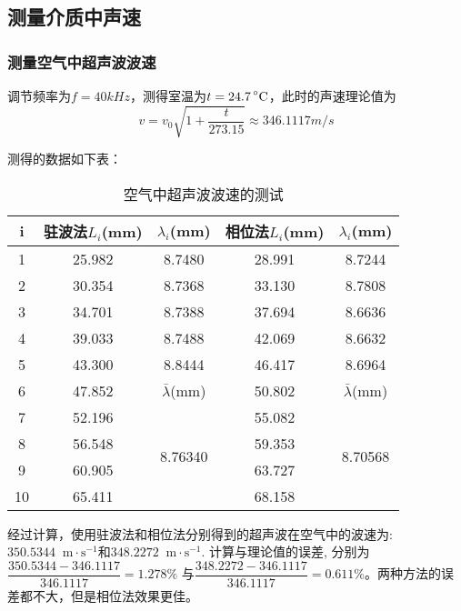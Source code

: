 \documentclass[11pt]{article}
\newcommand*{\unit}[1]{\mathop{}\!\mathrm{#1}}
\newcommand*{\mcelsius}{\unit{\prescript{\circ}{}C}}
\begin{document}
\subsection{测量介质中声速}

\subsubsection{测量空气中超声波波速}

调节频率为$f=40kHz$，测得室温为$t=24.7 \mcelsius$，此时的声速理论值为\begin{displaymath}v=v_0\sqrt{1+\frac{t}{273.15}}\approx 346.1117 m/s\end{displaymath}

测得的数据如下表：

\begin{table}[H]
    \centering
    \caption{空气中超声波波速的测试}
    \begin{tabular}{|c|c|c|c|c|}
        \hline
        i&驻波法$L_i$(mm)&$\lambda_i$(mm)&相位法$L_i$(mm)&$\lambda_i$(mm)\\
        \hline
        1&25.982  & 8.7480  & 28.991  & 8.7244 \\
        \hline
        2&30.354  & 8.7368  & 33.130  & 8.7808 \\
        \hline
        3&34.701  & 8.7388  & 37.694  & 8.6636 \\
        \hline
        4&39.033  & 8.7488  & 42.069  & 8.6632 \\
        \hline
        5&43.300  & 8.8444  & 46.417  & 8.6964 \\
        \hline
        6&47.852  &$\bar{\lambda}$(mm)&50.802&$\bar{\lambda}$(mm)\\
        \hline
        7&52.196&\multirow{4}{*}{8.76340}&55.082&\multirow{4}{*}{8.70568}\\
        \cline{1-2}\cline{4-4}
        8&56.548&&59.353&\\
        \cline{1-2}\cline{4-4}
        9&60.905&&63.727&\\
        \cline{1-2}\cline{4-4}
        10&65.411&&68.158&\\
        \hline
    \end{tabular}
\end{table}

经过计算，使用驻波法和相位法分别得到的超声波在空气中的波速为: $350.5344 \unit{m\cdot s^{-1}}$和$348.2272 \unit{m\cdot s^{-1}}$. 计算与理论值的误差, 分别为 $\dfrac{350.5344 - 346.1117}{346.1117} = 1.278\%$ 与$\dfrac{348.2272 - 346.1117}{346.1117} = 0.611\%$。两种方法的误差都不大，但是相位法效果更佳。
\end{document}
